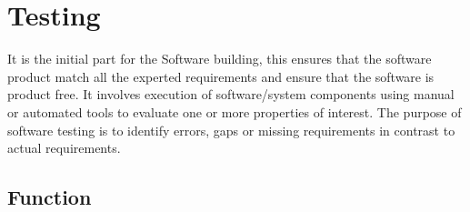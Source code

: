 %
%



\chapter{Testing}

It is the initial part for the Software building, this ensures that the software product match all the experted requirements and ensure that the software is product free. It involves execution of software/system components using manual or automated tools to evaluate one or more properties of interest. The purpose of software testing is to identify errors, gaps or missing requirements in contrast to actual requirements. \bigskip

\section{Function}


